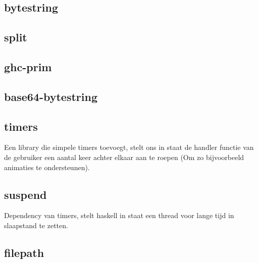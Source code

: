 \subsection{bytestring}
\subsection{split}
\subsection{ghc-prim}
\subsection{base64-bytestring}
\subsection{timers}
Een library die simpele timers toevoegt, stelt ons in staat de handler functie van de gebruiker een aantal keer achter elkaar aan te roepen (Om zo bijvoorbeeld animaties te ondersteunen).  
\subsection{suspend}
Dependency van timers, stelt haskell in staat een thread voor lange tijd in slaapstand te zetten.
\subsection{filepath}
